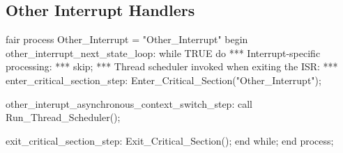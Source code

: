 \documentclass[sigplan,anonymous,10pt]{acmart}
\begin{document}
\subsection{Other Interrupt Handlers}
\begin{ppcal}
fair process Other_Interrupt = "Other_Interrupt"
begin
   other_interrupt_next_state_loop:
   while TRUE do
      \* *** Interrupt-specific processing: ***
      skip;
      \* *** Thread scheduler invoked when exiting the ISR: ***
      enter_critical_section_step:
      Enter_Critical_Section("Other_Interrupt");

      other_interupt_asynchronous_context_switch_step:
      call Run_Thread_Scheduler();

      exit_critical_section_step:
      Exit_Critical_Section();
   end while;
end process;
\end{ppcal}
\begin{tlatex}
%
\@x{ {\p@begin}}%
%
%
%
%
\@xx{}%
%
%
%
\@xx{}%
%
\@pvspace{8.0pt}%
%
%
\@pvspace{8.0pt}%
%
%
%
\@x{ {\p@end} {\p@process} {\p@semicolon}}%
\end{tlatex}
   
\end{document}
